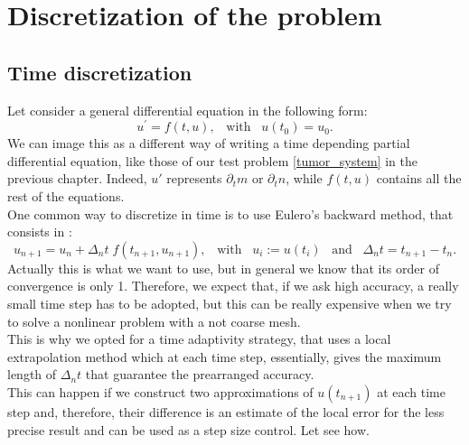 \chapter{Discretization of the problem}
\section{Time discretization}
Let consider a general differential equation in the following form: 
\begin{equation}
\label{diff_time}
u^\prime = f(t,u), \; \; \; \text{with} \; \;\; u(t_0) = u_0.
\end{equation} 
We can image this as a different way of writing a time depending partial differential equation, like those of our test problem \eqref{tumor_system} in the previous chapter. Indeed, $ u' $ represents $ \partial_t m $ or $ \partial_t n $, while $ f(t,u) $ contains all the rest of the equations. \\
One common way to discretize in time is to use Eulero's backward method, that consists in :
\begin{equation*}
u_{n+1} = u_n +  \Delta_n t \; f(t_{n+1}, u_{n+1}), \; \; \; \text{with}\; \; \; u_i := u(t_i)\; \;\; \text{and} \; \;\; \Delta_n t = t_{n+1}-t_n .
\end{equation*}
Actually this is what we want to use, but in general we know that its order of convergence is only 1. Therefore, we expect that, if we ask high accuracy, a really small time step has to be adopted, but this can be really expensive when we try to solve a nonlinear problem with a not coarse mesh. \\
This is why we opted for a time adaptivity strategy, that uses a local extrapolation method which at each time step, essentially, gives the maximum length of $ \Delta_n t $ that guarantee the prearranged accuracy. \\
This can happen if we construct two approximations of $ u (t_{n+1}) $  at each time step and, therefore, their difference is an estimate of the local error for the less precise result and can be used as a step size control. Let see how.
